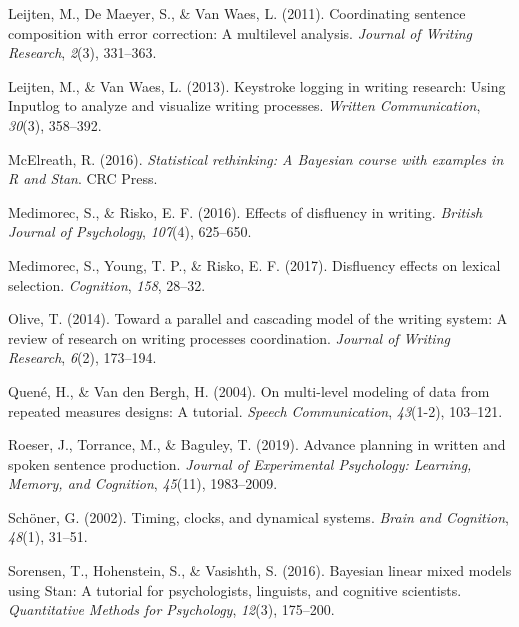 \documentclass[
  english,
  man,mask,floatsintext]{apa7}
\newlength{\cslhangindent}
\newenvironment{cslreferences}%
  {\setlength{\parindent}{0pt}%
  \everypar{\setlength{\hangindent}{\cslhangindent}}\ignorespaces}%
  {\par}
\begin{document}
\begin{cslreferences}
\leavevmode\hypertarget{ref-leijten2011coordinating}{}%
Leijten, M., De Maeyer, S., \& Van Waes, L. (2011). Coordinating sentence composition with error correction: A multilevel analysis. \emph{Journal of Writing Research}, \emph{2}(3), 331--363.

\leavevmode\hypertarget{ref-leijten2013keystroke}{}%
Leijten, M., \& Van Waes, L. (2013). Keystroke logging in writing research: Using Inputlog to analyze and visualize writing processes. \emph{Written Communication}, \emph{30}(3), 358--392.

\leavevmode\hypertarget{ref-mcelreath2016statistical}{}%
McElreath, R. (2016). \emph{Statistical rethinking: A Bayesian course with examples in R and Stan}. CRC Press.

\leavevmode\hypertarget{ref-medimorec2016effects}{}%
Medimorec, S., \& Risko, E. F. (2016). Effects of disfluency in writing. \emph{British Journal of Psychology}, \emph{107}(4), 625--650.

\leavevmode\hypertarget{ref-medimorec2017disfluency}{}%
Medimorec, S., Young, T. P., \& Risko, E. F. (2017). Disfluency effects on lexical selection. \emph{Cognition}, \emph{158}, 28--32.

\leavevmode\hypertarget{ref-olive2014toward}{}%
Olive, T. (2014). Toward a parallel and cascading model of the writing system: A review of research on writing processes coordination. \emph{Journal of Writing Research}, \emph{6}(2), 173--194.

\leavevmode\hypertarget{ref-quene2004multi}{}%
Quené, H., \& Van den Bergh, H. (2004). On multi-level modeling of data from repeated measures designs: A tutorial. \emph{Speech Communication}, \emph{43}(1-2), 103--121.

\leavevmode\hypertarget{ref-roeser2019advance}{}%
Roeser, J., Torrance, M., \& Baguley, T. (2019). Advance planning in written and spoken sentence production. \emph{Journal of Experimental Psychology: Learning, Memory, and Cognition}, \emph{45}(11), 1983--2009.

\leavevmode\hypertarget{ref-schoner2002timing}{}%
Schöner, G. (2002). Timing, clocks, and dynamical systems. \emph{Brain and Cognition}, \emph{48}(1), 31--51.

\leavevmode\hypertarget{ref-sorensen2016bayesian}{}%
Sorensen, T., Hohenstein, S., \& Vasishth, S. (2016). Bayesian linear mixed models using Stan: A tutorial for psychologists, linguists, and cognitive scientists. \emph{Quantitative Methods for Psychology}, \emph{12}(3), 175--200.


\end{cslreferences}
\end{document}
